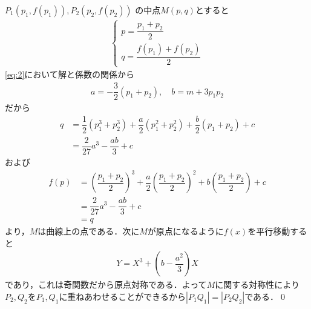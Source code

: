 \documentclass[../../main.tex]{subfiles}
\begin{document}
$P_1(p_1, f(p_1)), P_2(p_2, f(p_2))$ の中点$M(p,q)$とすると
\begin{align}
  \begin{cases}
    p = \dfrac{p_1+p_2}{2} \\
    q = \dfrac{f(p_1)+f(p_2)}{2}
  \end{cases}
\end{align}
\cref{eq:2}において解と係数の関係から
\begin{align}
  a = -\dfrac{3}{2}(p_1+p_2),
  \quad
  b = m+3p_1p_2
\end{align}
だから
\begin{align}
  q &= \dfrac{1}{2}(p_1^3+p_2^3) + \dfrac{a}{2}(p_1^2+p_2^2) + \dfrac{b}{2}(p_1+p_2) + c \\
  &= \dfrac{2}{27}a^3 - \dfrac{ab}{3} + c
\end{align}
および
\begin{align}
  f(p)
  &= \left(\dfrac{p_1+p_2}{2}\right)^3 + \dfrac{a}{2}\left(\dfrac{p_1+p_2}{2}\right)^2 + b\left(\dfrac{p_1+p_2}{2}\right) + c \\
  & = \dfrac{2}{27}a^3 - \dfrac{ab}{3} + c \\
  & = q
\end{align}
より，$M$は曲線上の点である．次に$M$が原点になるように$f(x)$を平行移動すると
\begin{align}
  Y = X^3 + \left(b-\dfrac{a^2}{3}\right)X
\end{align}
であり，これは奇関数だから原点対称である．よって$M$に関する対称性により$P_2, Q_2$を$P_1, Q_1$に重ねあわせることができるから$|P_1Q_1| = |P_2Q_2|$である．\qed
\end{document}
